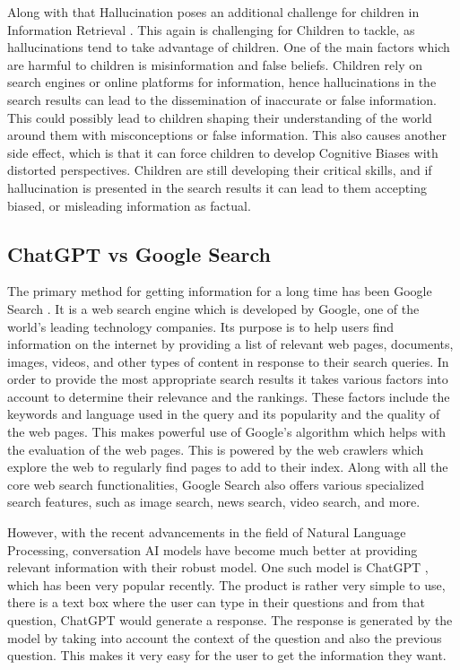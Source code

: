 \documentclass[50pt]{usiinfbachelorproject}
\begin{document}
Along with that Hallucination poses an additional challenge for children in Information Retrieval \cite{shuster_poff_chen_kiela_weston_2021}. This again is challenging for Children to tackle, as hallucinations tend to take advantage of children. One of the main factors which are harmful to children is misinformation and false beliefs. Children rely on search engines or online platforms for information, hence hallucinations in the search results can lead to the dissemination of inaccurate or false information. This could possibly lead to children shaping their understanding of the world around them with misconceptions or false information. This also causes another side effect, which is that it can force children to develop Cognitive Biases with distorted perspectives. Children are still developing their critical skills, and if hallucination is presented in the search results it can lead to them accepting biased, or misleading information as factual.

\subsection{ChatGPT vs Google Search}
The primary method for getting information for a long time has been Google Search \cite{hillis2012google}. It is a web search engine which is developed by Google, one of the world’s leading technology companies. Its purpose is to help users find information on the internet by providing a list of relevant web pages, documents, images, videos, and other types of content in response to their search queries. In order to provide the most appropriate search results it takes various factors into account to determine their relevance and the rankings. These factors include the keywords and language used in the query and its popularity and the quality of the web pages. This makes powerful use of Google’s algorithm which helps with the evaluation of the web pages. This is powered by the web crawlers which explore the web to regularly find pages to add to their index. Along with all the core web search functionalities, Google Search also offers various specialized search features, such as image search, news search, video search, and more. 

However, with the recent advancements in the field of Natural Language Processing, conversation AI models have become much better at providing relevant information with their robust model. One such model is ChatGPT \cite{firat2023chat}, which has been very popular recently. The product is rather very simple to use, there is a text box where the user can type in their questions and from that question, ChatGPT would generate a response. The response is generated by the model by taking into account the context of the question and also the previous question. This makes it very easy for the user to get the information they want.
\end{document}
